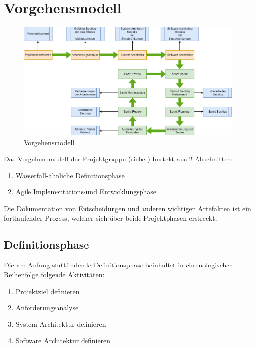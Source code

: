 \providecommand{\vmodelFirstSection}[1]{\section{#1}}
\providecommand{\vmodelSecondSection}[1]{\subsection{#1}}
\providecommand{\vmodelThirdSection}[1]{\subsubsection{#1}}

\vmodelFirstSection{Vorgehensmodell}
\begin{figure}[!ht]
	\centering
	\includegraphics[width=1.0\linewidth]{./ressourcen/vorgehensmodell.png}
	\caption{Vorgehensmodell}
	\label{fig:sec:vorgehensmodell}
\end{figure}
Das Vorgehensmodell der Projektgruppe (siehe ) besteht aus 2 Abschnitten:
\begin{enumerate}
	\item Wasserfall-ähnliche Definitionsphase
	\item Agile Implementations-und Entwicklungsphase
\end{enumerate}
Die Dokumentation von Entscheidungen und anderen wichtigen Artefakten ist ein fortlaufender Prozess, welcher sich über beide Projektphasen erstreckt.

\vmodelSecondSection{Definitionsphase}
Die am Anfang stattfindende Definitionsphase beinhaltet in chronologischer Reihenfolge folgende Aktivitäten:
\begin{enumerate}
	\item Projektziel definieren
	\item Anforderungsanalyse 
	\item System Architektur definieren
	\item Software Architektur definieren
\end{enumerate}

